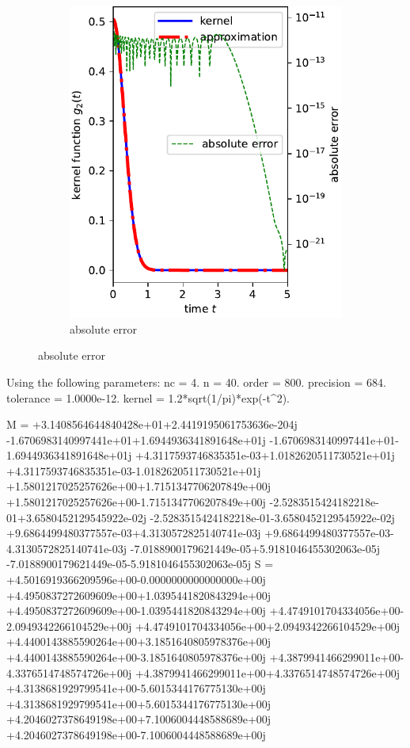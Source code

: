 \begin{figure}
\begin{subfigure}[b]{0.49\textwidth}
\includegraphics{PIC/g2}
\caption{absolute error}
\end{subfigure}
\end{figure}

Using the following parameters:
        nc = 4.
         n = 40.
     order = 800.
 precision = 684.
 tolerance = 1.0000e-12.
    kernel = 1.2*sqrt(1/pi)*exp(-t^2).

M = 
+3.1408564644840428e+01+2.4419195061753636e-204j
-1.6706983140997441e+01+1.6944936341891648e+01j
-1.6706983140997441e+01-1.6944936341891648e+01j
+4.3117593746835351e-03+1.0182620511730521e+01j
+4.3117593746835351e-03-1.0182620511730521e+01j
+1.5801217025257626e+00+1.7151347706207849e+00j
+1.5801217025257626e+00-1.7151347706207849e+00j
-2.5283515424182218e-01+3.6580452129545922e-02j
-2.5283515424182218e-01-3.6580452129545922e-02j
+9.6864499480377557e-03+4.3130572825140741e-03j
+9.6864499480377557e-03-4.3130572825140741e-03j
-7.0188900179621449e-05+5.9181046455302063e-05j
-7.0188900179621449e-05-5.9181046455302063e-05j
S = 
+4.5016919366209596e+00-0.0000000000000000e+00j
+4.4950837272609609e+00+1.0395441820843294e+00j
+4.4950837272609609e+00-1.0395441820843294e+00j
+4.4749101704334056e+00-2.0949342266104529e+00j
+4.4749101704334056e+00+2.0949342266104529e+00j
+4.4400143885590264e+00+3.1851640805978376e+00j
+4.4400143885590264e+00-3.1851640805978376e+00j
+4.3879941466299011e+00-4.3376514748574726e+00j
+4.3879941466299011e+00+4.3376514748574726e+00j
+4.3138681929799541e+00-5.6015344176775130e+00j
+4.3138681929799541e+00+5.6015344176775130e+00j
+4.2046027378649198e+00+7.1006004448588689e+00j
+4.2046027378649198e+00-7.1006004448588689e+00j


